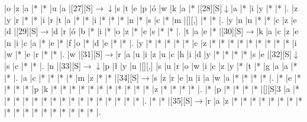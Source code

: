 \documentclass[11pt]{article}
\newcommand\drarr{$\rightarrow \!\!\!\!\! \downarrow$}
\newcommand\rarr{$\rightarrow$}
\newcommand\darr{$\downarrow$}
\begin{document}
\begin{Puzzle}{23}{28}
|o	|z	|a	|*	|*	|u	|a	|[27][S]\drarr	|s	|t	|e	|p	|ó	|w	|k	|a	|*	|[28][S]\darr	|a	|*	|i	|y	|*	|*	|.
|z	|y	|r	|*	|*	|i	|r	|t	|a	|*	|*	|i	|*	|*	|*	|n	|*	|s	|c	|*	|m	|[][,]{ }	|*	|*	|.
|y	|n	|n	|*	|*	|c	|z	|e	|d	|[29][S]\rarr	|d	|r	|ó	|b	|*	|i	|*	|o	|z	|*	|e	|s	|*	|*	|.
|t	|a	|e	|*	|[30][S]\rarr	|k	|a	|c	|z	|e	|n	|i	|c	|a	|*	|e	|*	|f	|o	|*	|d	|e	|*	|*	|.
|y	|*	|*	|*	|*	|*	|c	|z	|*	|*	|*	|*	|*	|*	|*	|*	|*	|i	|w	|*	|e	|r	|*	|*	|.
|w	|[31][S]\rarr	|r	|a	|u	|i	|z	|u	|c	|h	|i	|d	|y	|*	|*	|*	|*	|s	|e	|[32][S]\darr	|s	|c	|*	|*	|.
|n	|[33][S]\drarr	|p	|ł	|y	|n	|[][,]{ }	|s	|u	|r	|o	|w	|i	|c	|z	|y	|*	|t	|*	|g	|a	|a	|*	|*	|.
|a	|c	|*	|*	|*	|*	|m	|z	|*	|*	|[34][S]\rarr	|s	|z	|r	|e	|n	|i	|a	|w	|a	|*	|*	|*	|*	|.
|*	|e	|*	|*	|*	|*	|p	|k	|*	|*	|*	|*	|*	|*	|*	|*	|*	|*	|*	|z	|*	|*	|*	|*	|.
|*	|p	|*	|*	|*	|*	|[][S]3	|a	|*	|*	|*	|*	|*	|*	|*	|*	|*	|*	|*	|*	|*	|*	|*	|*	|.
|*	|*	|[35][S]\rarr	|r	|a	|z	|*	|*	|*	|*	|*	|*	|*	|*	|*	|*	|*	|*	|*	|*	|*	|*	|*	|*	|.\end{Puzzle}

\newpage
\end{document}
